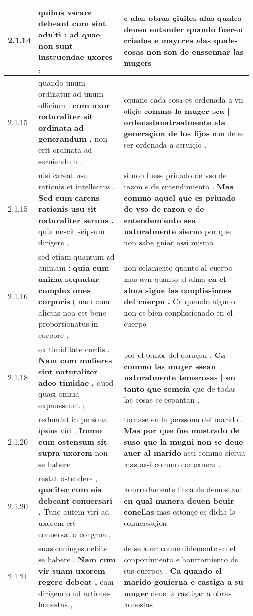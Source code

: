 \begin{tabular}{|p{1cm}|p{6.5cm}|p{6.5cm}|}
2.1.14 & quibus vacare debeant \textbf{ cum sint adulti : } ad quae non sunt instruendae uxores , & e alas obras çiuiles alas quales deuen entender \textbf{ quando fueren criados } e mayores alas quales cosas non son de enssennar las mugers \\\hline
2.1.15 & quando unum ordinatur ad unum officium : \textbf{ cum uxor naturaliter sit ordinata ad generandum , } non erit ordinata ad seruiendum . & çquano cada cosa es ordenada a vn ofiçio \textbf{ commo la muger sea | ordenadanatraalmente ala generaçion de los fijos } non deue ser ordenada a seruiçio . \\\hline
2.1.15 & nisi careat usu rationis et intellectus . \textbf{ Sed cum carens rationis usu sit naturaliter seruus , } quia nescit seipsum dirigere , & si non fuese priuado de vso de razon e de entendimiento . \textbf{ Mas commo aquel que es priuado de vso de razon e de entendemiento sea naturalmente sieruo } por que non sabe gniar assi mismo \\\hline
2.1.16 & sed etiam quantum ad animam : \textbf{ quia cum anima sequatur complexiones corporis } ( nam cum aliquis non est bene proportionatus in corpore , & non solamente quanto al cuerpo mas avn quanto al alma \textbf{ ca el alma sigue las conplissiones del cuerpo . } Ca quando alguno non es bien conplissionado en el cuerpo \\\hline
2.1.18 & ex timiditate cordis . \textbf{ Nam cum mulieres sint naturaliter adeo timidae , } quod quasi omnia expauescunt ; & por el temor del coraçon . \textbf{ Ca commo las muger ssean naturalmente temerosas | en tanto que semeia } que de todas las cosas se espantan . \\\hline
2.1.20 & redundat in persona ipsius viri . \textbf{ Immo cum ostensum sit supra uxorem } non se habere & tornase en la perssona del marido . \textbf{ Mas por que fue mostrado de suso que la mugni non se deue auer al marido } assi commo sierua mas assi commo conpanera . \\\hline
2.1.20 & restat ostendere , \textbf{ qualiter cum eis debeant conuersari . } Tunc autem viri ad uxorem est conuersatio congrua , & honrradamente finca de demostrar \textbf{ en qual manera deuen beuir conellas } mas estonçe es dicha la conuersaçion \\\hline
2.1.21 & suas coniuges debite se habere . \textbf{ Nam cum vir suam uxorem regere debeat , } eam dirigendo ad actiones honestas , & de se auer conueniblemente en el conponimiento e honrramiento de sus cuerpos . \textbf{ Ca quando el marido gouierna e castiga a su muger } deue la castigar a obras honestas \\\hline

\end{tabular}
